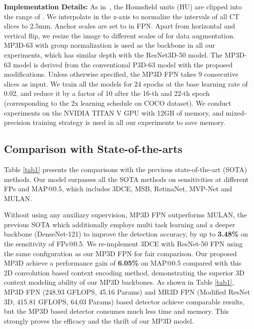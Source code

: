 \documentclass[runningheads]{llncs}
\begin{document}
\noindent\textbf{Implementation Details:} As in~\cite{Retina}, the Hounsfield units (HU) are clipped into the range of . 
We interpolate in the z-axis to normalize the intervals of all CT slices to 2.5mm.
Anchor scales are set to  in FPN.
Apart from horizontal and vertical flip, we resize the image to different scales of  for data augmentation.
MP3D-63 with group normalization\cite{GN} is used as the backbone in all our experiments, which has similar depth with the ResNet3D-50 model. The MP3D-63 model is derived from the conventional P3D-63\cite{P3D} model with the proposed modifications.  
Unless otherwise specified, the MP3D FPN takes 9 consecutive slices as input. 
We train all the models for 24 epochs at the base learning rate of 0.02, and reduce it by a factor of 10 after the 16-th and 22-th epoch (corresponding to the 2x learning schedule\cite{Rethinking} on COCO dataset). 
We conduct experiments on the NVIDIA TITAN V GPU with 12GB of memory, and mixed-precision training strategy is used in all our experiments to save memory.  


\subsection{Comparison with State-of-the-arts}


Table \ref{tab1} presents the comparisons with the previous state-of-the-art (SOTA) methods.
Our model surpasses all the SOTA methods on sensitivities at different FPs and MAP@0.5, which includes 3DCE\cite{3DCE}, MSB\cite{MSB}, RetinaNet\cite{Retina}, MVP-Net\cite{MVP} and MULAN\cite{MULAN}.

Without using any auxiliary supervision, MP3D FPN outperforms MULAN, the previous SOTA which additionally employs multi task learning and a deeper backbone (DenseNet-121) to improve the detection accuracy, by up to \textbf{3.48\%} on the sensitivity of FPs@0.5.
We re-implement 3DCE with ResNet-50 FPN using the same configuration as our MP3D FPN for fair comparison. Our proposed MP3D achieve a performance gain of \textbf{6.05\%} on MAP@0.5 compared with this 2D convolution based context encoding method, demonstrating the superior 3D context modeling ability of our MP3D backbones. 
As shown in Table \ref{tab1}, MP3D FPN (248.93 GFLOPS, 45.16  Params) and MR3D FPN (Modified ResNet 3D, 415.81 GFLOPS, 64.03  Params) based detector achieve comparable results, but the MP3D based detector consumes much less time and memory.
This strongly proves the efficacy and the thrift of our MP3D model.
\end{document}
